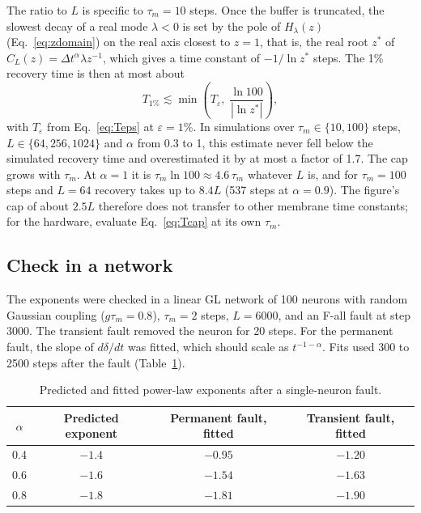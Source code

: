 \documentclass[11pt,a4paper]{article}
\begin{document}
The ratio to $L$ is specific to $\tau_m = 10$ steps. Once the buffer is truncated, the slowest decay of a real mode $\lambda < 0$ is set by the pole of $H_\lambda(z)$ (Eq.~\eqref{eq:zdomain}) on the real axis closest to $z = 1$, that is, the real root $z^{*}$ of $C_L(z) = \Delta t^{\alpha} \lambda z^{-1}$, which gives a time constant of $-1/\ln z^{*}$ steps. The 1\% recovery time is then at most about
\begin{equation}
T_{1\%} \lesssim \min\left( T_{\varepsilon},\; \frac{\ln 100}{|\ln z^{*}|} \right),
\label{eq:Tcap}
\end{equation}
with $T_{\varepsilon}$ from Eq.~\eqref{eq:Teps} at $\varepsilon = 1\%$. In simulations over $\tau_m \in \{10, 100\}$ steps, $L \in \{64, 256, 1024\}$ and $\alpha$ from 0.3 to 1, this estimate never fell below the simulated recovery time and overestimated it by at most a factor of 1.7. The cap grows with $\tau_m$. At $\alpha = 1$ it is $\tau_m \ln 100 \approx 4.6\,\tau_m$ whatever $L$ is, and for $\tau_m = 100$ steps and $L = 64$ recovery takes up to $8.4L$ (537 steps at $\alpha = 0.9$). The figure's cap of about $2.5L$ therefore does not transfer to other membrane time constants; for the hardware, evaluate Eq.~\eqref{eq:Tcap} at its own $\tau_m$.

\subsection{Check in a network}

The exponents were checked in a linear GL network of 100 neurons with random Gaussian coupling ($g\tau_m = 0.8$), $\tau_m = 2$ steps, $L = 6000$, and an F-all fault at step 3000. The transient fault removed the neuron for 20 steps. For the permanent fault, the slope of $d\delta/dt$ was fitted, which should scale as $t^{-1-\alpha}$. Fits used 300 to 2500 steps after the fault (Table~\ref{tab:exponents}).

\begin{table}[h]
\centering
\small
\begin{tabular}{@{}cccc@{}}
\toprule
$\alpha$ & Predicted exponent & Permanent fault, fitted & Transient fault, fitted \\
\midrule
0.4 & $-1.4$ & $-0.95$ & $-1.20$ \\
0.6 & $-1.6$ & $-1.54$ & $-1.63$ \\
0.8 & $-1.8$ & $-1.81$ & $-1.90$ \\
\bottomrule
\end{tabular}
\caption{Predicted and fitted power-law exponents after a single-neuron fault.}
\label{tab:exponents}
\end{table}
\end{document}
